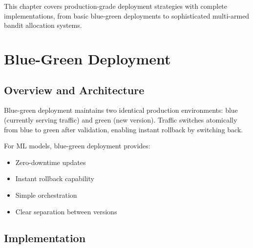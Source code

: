 This chapter covers production-grade deployment strategies with complete implementations, from basic blue-green deployments to sophisticated multi-armed bandit allocation systems.

\section{Blue-Green Deployment}

\subsection{Overview and Architecture}

Blue-green deployment maintains two identical production environments: blue (currently serving traffic) and green (new version). Traffic switches atomically from blue to green after validation, enabling instant rollback by switching back.

For ML models, blue-green deployment provides:
\begin{itemize}
    \item Zero-downtime updates
    \item Instant rollback capability
    \item Simple orchestration
    \item Clear separation between versions
\end{itemize}

\subsection{Implementation}

